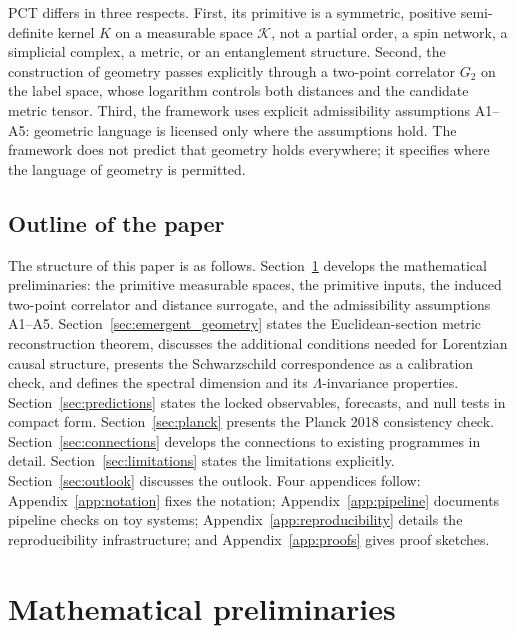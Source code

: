 ﻿\documentclass[12pt,a4paper]{article}
\theoremstyle{definition}
\begin{document}
PCT differs in three respects. First, its primitive is a symmetric, positive semi-definite kernel $K$ on a measurable space $\mathcal{K}$, not a partial order, a spin network, a simplicial complex, a metric, or an entanglement structure. Second, the construction of geometry passes explicitly through a two-point correlator $G_2$ on the label space, whose logarithm controls both distances and the candidate metric tensor. Third, the framework uses explicit admissibility assumptions A1--A5: geometric language is licensed only where the assumptions hold. The framework does not predict that geometry holds everywhere; it specifies where the language of geometry is permitted.

\subsection{Outline of the paper}

The structure of this paper is as follows. Section~\ref{sec:preliminaries} develops the mathematical preliminaries: the primitive measurable spaces, the primitive inputs, the induced two-point correlator and distance surrogate, and the admissibility assumptions A1--A5. Section~\ref{sec:emergent_geometry} states the Euclidean-section metric reconstruction theorem, discusses the additional conditions needed for Lorentzian causal structure, presents the Schwarzschild correspondence as a calibration check, and defines the spectral dimension and its $\Lambda$-invariance properties. Section~\ref{sec:predictions} states the locked observables, forecasts, and null tests in compact form. Section~\ref{sec:planck} presents the Planck 2018 consistency check. Section~\ref{sec:connections} develops the connections to existing programmes in detail. Section~\ref{sec:limitations} states the limitations explicitly. Section~\ref{sec:outlook} discusses the outlook. Four appendices follow: Appendix~\ref{app:notation} fixes the notation; Appendix~\ref{app:pipeline} documents pipeline checks on toy systems; Appendix~\ref{app:reproducibility} details the reproducibility infrastructure; and Appendix~\ref{app:proofs} gives proof sketches.

\section{Mathematical preliminaries}
\label{sec:preliminaries}
\end{document}
